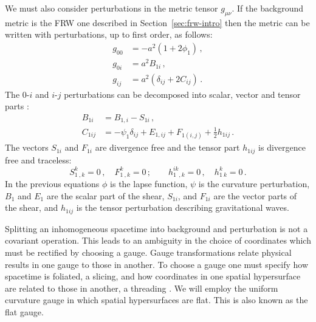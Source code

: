 We must also consider perturbations in the metric tensor $g_{\mu\nu}$. If the
background metric is the FRW one described in Section~\ref{sec:frw-intro} then
the metric can be written with perturbations, up to first order, as follows:
% 
\begin{align}
 \label{eq:pertmetric-intro}
 g_{00} &= -a^2 (1 + 2\phi_1) \,, \nonumber\\
 g_{0i} &= a^2 B_{1i} \,, \nonumber\\
 g_{ij} &= a^2\left(\delta_{ij} + 2C_{ij} \right) \,.
\end{align}
% 
The $0$-$i$ and $i$-$j$ perturbations can be decomposed into scalar, vector and
tensor parts \cite{Malik:2008im}:
\begin{align}
\label{eq:svt-intro}
  B_{1i} &= B_{1,i} - S_{1i} \,, \nonumber\\
  C_{1ij} &= -\psi_1\delta_{ij} + E_{1,ij} + F_{1(i,j)} + \frac{1}{2}h_{1ij}\,.
\end{align}
% 
The vectors $S_{1i}$ and $F_{1i}$ are divergence free and the tensor part
$h_{1ij}$
is divergence free and traceless:
% 
\begin{equation}
 S^k_{1~,k} = 0\,, \quad F^k_{1~,k}=0\,; \qquad h^{ik}_{1~~,k} = 0\,,
  \quad h^k_{1~k}= 0\,.
\end{equation}
% 
In the previous equations $\phi$ is the lapse function, $\psi$ is the curvature
perturbation, $B_1$ and $E_1$ are the scalar part of the shear, $S_{1i}$, and
$F_{1i}$
are the vector parts of the shear, and $h_{1ij}$ is the tensor perturbation
describing gravitational waves.


Splitting an inhomogeneous spacetime into background and perturbation is not a
covariant operation. This leads to an ambiguity in the choice of coordinates
which must be rectified by choosing a gauge. Gauge transformations relate
physical results in one gauge to those in another. To choose a gauge one must
specify how spacetime is foliated, \iec a slicing, and how coordinates in one
spatial hypersurface are related to those in another, \iec a threading
\cite{Malik:2008im}. We will
employ the uniform curvature gauge in which spatial hypersurfaces are flat. This
is also known as the flat gauge.

